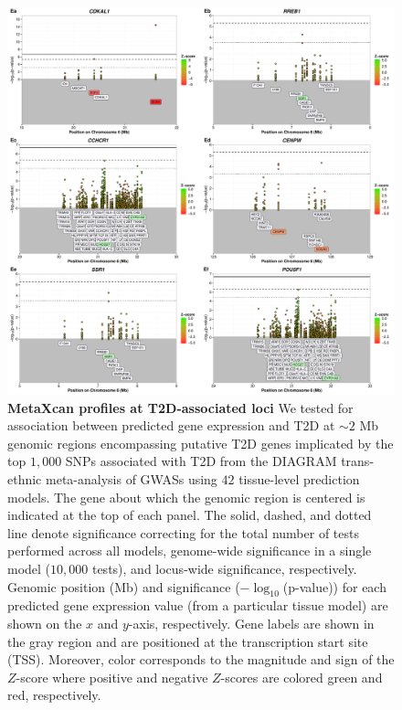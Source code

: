 \documentclass[10pt]{article}
\begin{document}
\begin{figure}
\ContinuedFloat
\includegraphics[width=\textwidth]{sup_fig1_part5_locusArray.pdf}
	\caption{\textbf{MetaXcan profiles at T2D-associated loci} We tested for association between predicted gene expression and T2D at $\sim2$ Mb genomic regions encompassing putative T2D genes implicated by the top $1,000$ SNPs associated with T2D from the DIAGRAM trans-ethnic meta-analysis of GWASs using $42$ tissue-level prediction models. The gene about which the genomic region is centered is indicated at the top of each panel. The solid, dashed, and dotted line denote significance correcting for the total number of tests performed across all models, genome-wide significance in a single model ($10,000$ tests), and locus-wide significance, respectively. Genomic position (Mb) and significance ($-\log_{10}$(p-value)) for each predicted gene expression value (from a particular tissue model) are shown on the $x$ and $y$-axis, respectively. Gene labels are shown in the gray region and are positioned at the transcription start site (TSS). Moreover, color corresponds to the magnitude and sign of the $Z$-score where positive and negative $Z$-scores are colored green and red, respectively.} 
    \label{fig:supp.locus_array_fig1_part5}
\end{figure}
\end{document}
